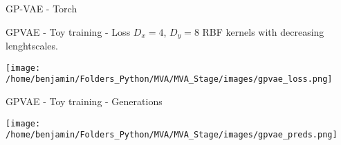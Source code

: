 \begin{frame}[fragile]{GP-VAE - Torch}
\begin{figure}[h]
    \centering
\end{figure}


\end{frame}

\begin{frame}{GPVAE - Toy training - Loss}
    $D_x = 4$, $D_y=8$ RBF kernels with decreasing lenghtscales.
    \begin{center}
    \texttt{[image: /home/benjamin/Folders\_Python/MVA/MVA\_Stage/images/gpvae\_loss.png]}
    \end{center}
\end{frame}

\begin{frame}{GPVAE - Toy training - Generations}
    \begin{center}
    \texttt{[image: /home/benjamin/Folders\_Python/MVA/MVA\_Stage/images/gpvae\_preds.png]}
    \end{center}
\end{frame}